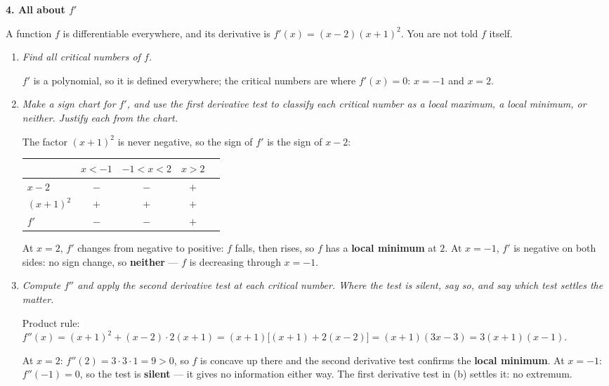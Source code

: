 \documentclass[11pt]{article}
\newcommand{\q}[1]{{\color{gray!55!black}\itshape #1}\par\smallskip}
\newenvironment{statement}{\par\color{gray!55!black}}{\par\medskip}
\newcommand{\prob}[1]{\bigskip\noindent\textbf{\large #1}\par\smallskip}
\begin{document}
\prob{4. All about $f'$}

\begin{statement}
A function $f$ is differentiable everywhere, and its derivative is $f'(x) = (x-2)(x+1)^2$. You are not told $f$ itself.
\end{statement}
\begin{enumerate}
\item \q{Find all critical numbers of $f$.}
$f'$ is a polynomial, so it is defined everywhere; the critical numbers are where
$f'(x)=0$: $\boxed{x=-1}$ and $\boxed{x=2}$.

\item \q{Make a sign chart for $f'$, and use the first derivative test to classify each critical number as a local maximum, a local minimum, or neither. Justify each from the chart.}
The factor $(x+1)^2$ is never negative, so the sign of $f'$ is the sign of $x-2$:

\smallskip
\begin{center}
\begin{tabular}{@{}lcccc@{}}
\toprule
 & $x<-1$ & $-1<x<2$ & $x>2$ \\
\midrule
$x-2$ & $-$ & $-$ & $+$ \\
$(x+1)^2$ & $+$ & $+$ & $+$ \\
$f'$ & $-$ & $-$ & $+$ \\
\bottomrule
\end{tabular}
\end{center}
\smallskip

At $x=2$, $f'$ changes from negative to positive: $f$ falls, then rises, so $f$ has a
\textbf{local minimum} at $2$. At $x=-1$, $f'$ is negative on both sides: no sign change,
so \textbf{neither} --- $f$ is decreasing through $x=-1$.

\item \q{Compute $f''$ and apply the second derivative test at each critical number. Where the test is silent, say so, and say which test settles the matter.}
Product rule: $f''(x) = (x+1)^2 + (x-2)\cdot2(x+1) = (x+1)\big[(x+1)+2(x-2)\big]
= (x+1)(3x-3) = 3(x+1)(x-1)$.

At $x=2$: $f''(2) = 3\cdot3\cdot1 = 9>0$, so $f$ is concave up there and the second
derivative test confirms the \textbf{local minimum}. At $x=-1$: $f''(-1)=0$, so the test
is \textbf{silent} --- it gives no information either way. The first derivative test in
(b) settles it: no extremum.


\end{enumerate}
\end{document}
